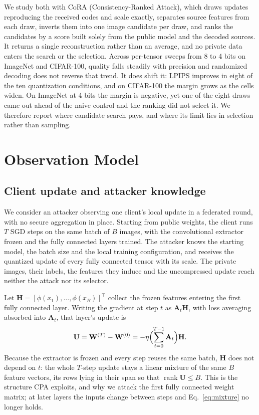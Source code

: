 \documentclass{article}
\newcommand{\U}{\mathbf{U}}
\newcommand{\HH}{\mathbf{H}}
\newcommand{\cora}{CoRA}
\begin{document}
We study both with \cora{} (Consistency-Ranked Attack), which draws updates
reproducing the received codes and scale exactly, separates source features
from each draw, inverts them into one image candidate per draw, and ranks the
candidates by a score built solely from the public model and the decoded
sources. It returns a single reconstruction rather than an average, and no
private data enters the search or the selection. Across per-tensor sweeps from
8 to 4 bits on ImageNet and CIFAR-100, quality falls steadily with precision
and randomized decoding does not reverse that trend. It does shift it: LPIPS
improves in eight of the ten quantization conditions, and on CIFAR-100 the
margin grows as the cells widen. On ImageNet at 4 bits the margin is negative,
yet one of the eight draws came out ahead of the naive control and the ranking
did not select it. We therefore report where candidate search pays, and where
its limit lies in selection rather than sampling.


\section{Observation Model}
\label{sec:observation}
\subsection{Client update and attacker knowledge}
We consider an attacker observing one client's local update in a federated
round, with no secure aggregation in place. Starting from public weights, the
client runs $T$ SGD steps on the same batch of $B$ images, with the
convolutional extractor frozen and the fully connected layers trained. The
attacker knows the starting model, the batch size and the local training
configuration, and receives the quantized update of every fully connected
tensor with its scale. The private images, their labels, the features they
induce and the uncompressed update reach neither the attack nor its selector.

Let $\HH=[\phi(x_1),\ldots,\phi(x_B)]^\top$ collect the frozen features
entering the first fully connected layer. Writing the gradient at step $t$ as
$\mathbf{A}_t\HH$, with loss averaging absorbed into $\mathbf{A}_t$, that
layer's update is
\begin{equation}
 \U=\mathbf{W}^{(T)}-\mathbf{W}^{(0)}
     =-\eta\Bigl(\sum_{t=0}^{T-1}\mathbf{A}_t\Bigr)\HH .
 \label{eq:mixture}
\end{equation}
Because the extractor is frozen and every step reuses the same batch, $\HH$
does not depend on $t$: the whole $T$-step update stays a linear mixture of
the same $B$ feature vectors, its rows lying in their span so that
$\operatorname{rank}\U\le B$. This is the structure CPA exploits, and why we
attack the first fully connected weight matrix; at later layers the inputs
change between steps and Eq.~\eqref{eq:mixture} no longer holds.
\end{document}
